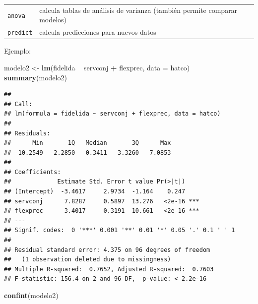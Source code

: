 \documentclass[]{book}
\newenvironment{Shaded}{\begin{snugshade}}{\end{snugshade}}
\newcommand{\DataTypeTok}[1]{\textcolor[rgb]{0.13,0.29,0.53}{#1}}
\newcommand{\KeywordTok}[1]{\textcolor[rgb]{0.13,0.29,0.53}{\textbf{#1}}}
\newcommand{\NormalTok}[1]{#1}
\newcommand{\OperatorTok}[1]{\textcolor[rgb]{0.81,0.36,0.00}{\textbf{#1}}}
\newcommand{\StringTok}[1]{\textcolor[rgb]{0.31,0.60,0.02}{#1}}
\begin{document}
\begin{longtable}[]{@{}ll@{}}
\begin{minipage}[t]{0.11\columnwidth}\raggedright
\texttt{anova}\strut
\end{minipage} & \begin{minipage}[t]{0.83\columnwidth}\raggedright
calcula tablas de análisis de varianza (también permite comparar modelos)\strut
\end{minipage}\tabularnewline
\begin{minipage}[t]{0.11\columnwidth}\raggedright
\texttt{predict}\strut
\end{minipage} & \begin{minipage}[t]{0.83\columnwidth}\raggedright
calcula predicciones para nuevos datos\strut
\end{minipage}\tabularnewline
\bottomrule
\end{longtable}

Ejemplo:

\begin{Shaded}
\begin{Highlighting}[]
\NormalTok{modelo2 <-}\StringTok{ }\KeywordTok{lm}\NormalTok{(fidelida }\OperatorTok{~}\StringTok{ }\NormalTok{servconj }\OperatorTok{+}\StringTok{ }\NormalTok{flexprec, }\DataTypeTok{data =}\NormalTok{ hatco)}
\KeywordTok{summary}\NormalTok{(modelo2)}
\end{Highlighting}
\end{Shaded}

\begin{verbatim}
## 
## Call:
## lm(formula = fidelida ~ servconj + flexprec, data = hatco)
## 
## Residuals:
##      Min       1Q   Median       3Q      Max 
## -10.2549  -2.2850   0.3411   3.3260   7.0853 
## 
## Coefficients:
##             Estimate Std. Error t value Pr(>|t|)    
## (Intercept)  -3.4617     2.9734  -1.164    0.247    
## servconj      7.8287     0.5897  13.276   <2e-16 ***
## flexprec      3.4017     0.3191  10.661   <2e-16 ***
## ---
## Signif. codes:  0 '***' 0.001 '**' 0.01 '*' 0.05 '.' 0.1 ' ' 1
## 
## Residual standard error: 4.375 on 96 degrees of freedom
##   (1 observation deleted due to missingness)
## Multiple R-squared:  0.7652, Adjusted R-squared:  0.7603 
## F-statistic: 156.4 on 2 and 96 DF,  p-value: < 2.2e-16
\end{verbatim}

\begin{Shaded}
\begin{Highlighting}[]
\KeywordTok{confint}\NormalTok{(modelo2)}
\end{Highlighting}
\end{Shaded}
\end{document}
